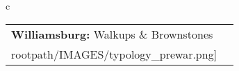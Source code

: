 \begin{table}[H]
        \begin{tabular}{c}
        \begin{tabular}{m{1.5in} m{2in}}
\textbf{Williamsburg:} {Walkups \& Brownstones} & \texttt{[image: \\rootpath/IMAGES/typology\_prewar.png]}
\end{tabular}\end{tabular}
        \end{table}